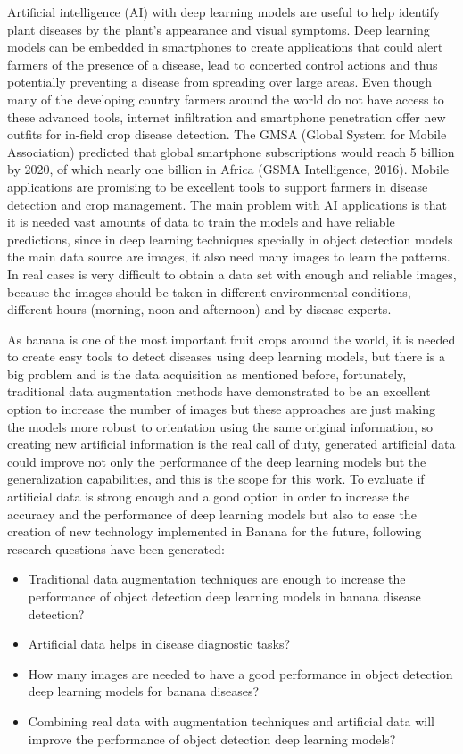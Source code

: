 Artificial intelligence (AI) with deep learning models \cite{goodfellow2016deep} are useful to help identify plant diseases by the plant’s appearance and visual symptoms\cite{camargo2009image}. Deep learning models can be embedded in smartphones to create applications that could alert farmers of the presence of a disease, lead to concerted control actions and thus potentially preventing a disease from spreading over large areas\cite{mohanty2016using}. Even though many of the developing country farmers around the world do not have access to these advanced tools, internet infiltration and smartphone penetration offer new outfits for in-field crop disease detection. The GMSA (Global System for Mobile Association) predicted that global smartphone subscriptions would reach 5 billion by 2020, of which nearly one billion in Africa (GSMA Intelligence, 2016). 
Mobile applications are promising to be excellent tools to support farmers in disease detection and crop management. The main problem with AI applications is that it is needed vast amounts of data to train the models and have reliable predictions, since in deep learning techniques specially in object detection models the main data source are images, it also need many images to learn the patterns. In real cases is very difficult to obtain a data set with enough and reliable images, because the images should be taken in different environmental conditions, different hours (morning, noon and afternoon) and by disease experts. 

As banana is one of the most important fruit crops around the world, it is needed to create easy tools to detect diseases using deep learning models, but there is a big problem and is the data acquisition as mentioned before, fortunately, traditional data augmentation methods have demonstrated  to be an excellent option to increase the number of images\cite{barbedo2018impact} but these approaches are just making the models more robust to orientation using the same original information, so creating new artificial information is the real call of duty, generated artificial data could improve not only the performance of the deep learning models but the generalization capabilities, and this is the scope for this work. To evaluate if artificial data is strong enough and a good option in order to increase the accuracy and the performance of deep learning models but also to ease the creation of new technology implemented in Banana for the future, following research questions have been generated: 
\begin{itemize} 
\item Traditional data augmentation techniques are enough to increase the performance of object detection deep learning models in banana disease detection?
\item Artificial data helps in disease diagnostic tasks?
\item How many images are needed to have a good performance in object detection deep learning models for banana diseases?
\item Combining real data with augmentation techniques and artificial data will improve the performance of object detection deep learning models?
\end{itemize}  